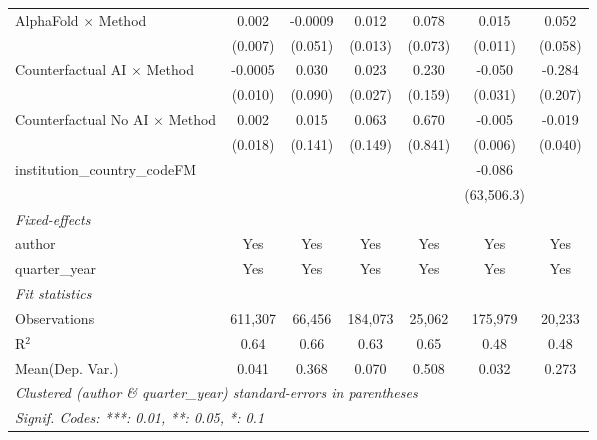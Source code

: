 \begin{tabular}{lcccccc}
   AlphaFold $\times$ Method             & 0.002          & -0.0009       & 0.012         & 0.078         & 0.015         & 0.052\\   
                                         & (0.007)        & (0.051)       & (0.013)       & (0.073)       & (0.011)       & (0.058)\\   
   Counterfactual AI $\times$ Method     & -0.0005        & 0.030         & 0.023         & 0.230         & -0.050        & -0.284\\   
                                         & (0.010)        & (0.090)       & (0.027)       & (0.159)       & (0.031)       & (0.207)\\   
   Counterfactual No AI $\times$ Method  & 0.002          & 0.015         & 0.063         & 0.670         & -0.005        & -0.019\\   
                                         & (0.018)        & (0.141)       & (0.149)       & (0.841)       & (0.006)       & (0.040)\\   
   institution\_country\_codeFM          &                &               &               &               & -0.086        &   \\   
                                         &                &               &               &               & (63,506.3)    &   \\   
   \midrule
   \emph{Fixed-effects}\\
   author                                & Yes            & Yes           & Yes           & Yes           & Yes           & Yes\\  
   quarter\_year                         & Yes            & Yes           & Yes           & Yes           & Yes           & Yes\\  
   \midrule
   \emph{Fit statistics}\\
   Observations                          & 611,307        & 66,456        & 184,073       & 25,062        & 175,979       & 20,233\\  
   R$^2$                                 & 0.64           & 0.66          & 0.63          & 0.65          & 0.48          & 0.48\\  
Mean(Dep. Var.) & 0.041 & 0.368 & 0.070 & 0.508 & 0.032 & 0.273 \\
   \midrule \midrule
   \multicolumn{7}{l}{\emph{Clustered (author \& quarter\_year) standard-errors in parentheses}}\\
   \multicolumn{7}{l}{\emph{Signif. Codes: ***: 0.01, **: 0.05, *: 0.1}}\\
\end{tabular}
\par\endgroup
